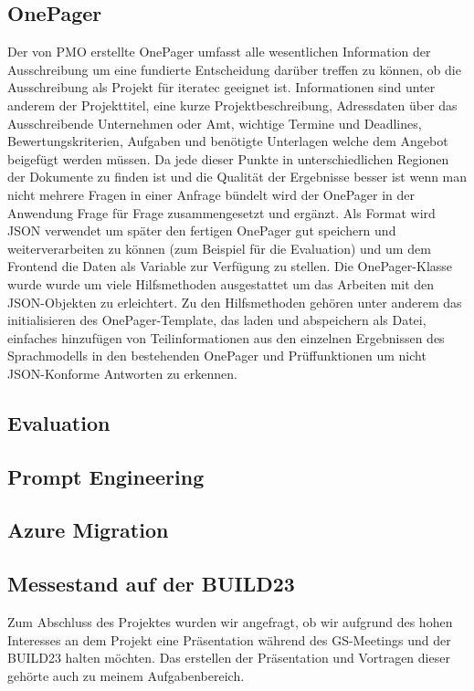 \subsection{OnePager}
Der von PMO erstellte OnePager umfasst alle wesentlichen Information der Ausschreibung um eine fundierte Entscheidung darüber treffen zu 
können, ob die Ausschreibung als Projekt für iteratec geeignet ist. Informationen sind unter anderem der Projekttitel, eine kurze Projektbeschreibung, 
Adressdaten über das Ausschreibende Unternehmen oder Amt, wichtige Termine und Deadlines, Bewertungskriterien, Aufgaben und benötigte Unterlagen welche 
dem Angebot beigefügt werden müssen. Da jede dieser Punkte in unterschiedlichen Regionen der Dokumente zu finden ist und die Qualität der Ergebnisse 
besser ist wenn man nicht mehrere Fragen in einer Anfrage bündelt wird der OnePager in der Anwendung Frage für Frage zusammengesetzt und ergänzt.
Als Format wird JSON verwendet um später den fertigen OnePager gut speichern und weiterverarbeiten zu können (zum Beispiel für die Evaluation) und um dem
Frontend die Daten als Variable zur Verfügung zu stellen. Die OnePager-Klasse wurde wurde um viele Hilfsmethoden ausgestattet um das Arbeiten mit den 
JSON-Objekten zu erleichtert. Zu den Hilfsmethoden gehören unter anderem das initialisieren des OnePager-Template, das laden und abspeichern als Datei, 
einfaches hinzufügen von Teilinformationen aus den einzelnen Ergebnissen des Sprachmodells in den bestehenden OnePager und Prüffunktionen um nicht 
JSON-Konforme Antworten zu erkennen. 

\subsection{Evaluation}
\label{chap:Evaluation}

\subsection{Prompt Engineering}

\subsection{Azure Migration}

\subsection{Messestand auf der BUILD23}

Zum Abschluss des Projektes wurden wir angefragt, ob wir 
aufgrund des hohen Interesses an dem Projekt eine Präsentation während des GS-Meetings und der BUILD23 halten möchten. 
Das erstellen der Präsentation und Vortragen dieser gehörte auch zu meinem Aufgabenbereich.

